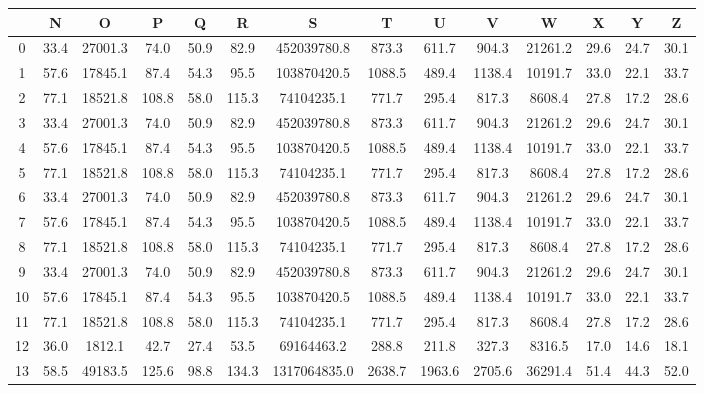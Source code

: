 \begin{table}[htbp]
\centering
\small
\setlength\tabcolsep{2pt}
\begin{tabular}{|c|c|c|c|c|c|c|c|c|c|c|c|c|c|}
\hline
{} &     N &       O &     P &     Q &     R &            S &      T &      U &      V &       W &    X &    Y &    Z \\
\hline
0  &  33.4 & 27001.3 &  74.0 &  50.9 &  82.9 &  452039780.8 &  873.3 &  611.7 &  904.3 & 21261.2 & 29.6 & 24.7 & 30.1 \\
1  &  57.6 & 17845.1 &  87.4 &  54.3 &  95.5 &  103870420.5 & 1088.5 &  489.4 & 1138.4 & 10191.7 & 33.0 & 22.1 & 33.7 \\
2  &  77.1 & 18521.8 & 108.8 &  58.0 & 115.3 &   74104235.1 &  771.7 &  295.4 &  817.3 &  8608.4 & 27.8 & 17.2 & 28.6 \\
3  &  33.4 & 27001.3 &  74.0 &  50.9 &  82.9 &  452039780.8 &  873.3 &  611.7 &  904.3 & 21261.2 & 29.6 & 24.7 & 30.1 \\
4  &  57.6 & 17845.1 &  87.4 &  54.3 &  95.5 &  103870420.5 & 1088.5 &  489.4 & 1138.4 & 10191.7 & 33.0 & 22.1 & 33.7 \\
5  &  77.1 & 18521.8 & 108.8 &  58.0 & 115.3 &   74104235.1 &  771.7 &  295.4 &  817.3 &  8608.4 & 27.8 & 17.2 & 28.6 \\
6  &  33.4 & 27001.3 &  74.0 &  50.9 &  82.9 &  452039780.8 &  873.3 &  611.7 &  904.3 & 21261.2 & 29.6 & 24.7 & 30.1 \\
7  &  57.6 & 17845.1 &  87.4 &  54.3 &  95.5 &  103870420.5 & 1088.5 &  489.4 & 1138.4 & 10191.7 & 33.0 & 22.1 & 33.7 \\
8  &  77.1 & 18521.8 & 108.8 &  58.0 & 115.3 &   74104235.1 &  771.7 &  295.4 &  817.3 &  8608.4 & 27.8 & 17.2 & 28.6 \\
9  &  33.4 & 27001.3 &  74.0 &  50.9 &  82.9 &  452039780.8 &  873.3 &  611.7 &  904.3 & 21261.2 & 29.6 & 24.7 & 30.1 \\
10 &  57.6 & 17845.1 &  87.4 &  54.3 &  95.5 &  103870420.5 & 1088.5 &  489.4 & 1138.4 & 10191.7 & 33.0 & 22.1 & 33.7 \\
11 &  77.1 & 18521.8 & 108.8 &  58.0 & 115.3 &   74104235.1 &  771.7 &  295.4 &  817.3 &  8608.4 & 27.8 & 17.2 & 28.6 \\
12 &  36.0 &  1812.1 &  42.7 &  27.4 &  53.5 &   69164463.2 &  288.8 &  211.8 &  327.3 &  8316.5 & 17.0 & 14.6 & 18.1 \\
13 &  58.5 & 49183.5 & 125.6 &  98.8 & 134.3 & 1317064835.0 & 2638.7 & 1963.6 & 2705.6 & 36291.4 & 51.4 & 44.3 & 52.0 \\

\end{tabular}
\end{table}
